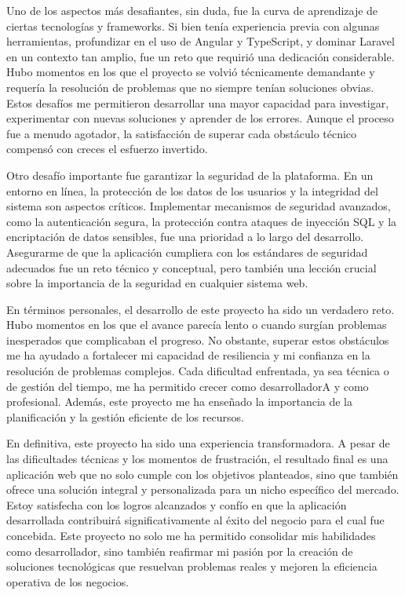 \vspace{0.5cm}

Uno de los aspectos más desafiantes, sin duda, fue la curva de aprendizaje de ciertas tecnologías y frameworks. Si bien tenía experiencia previa con algunas herramientas, profundizar en el uso de Angular y TypeScript, y dominar Laravel en un contexto tan amplio, fue un reto que requirió una dedicación considerable. Hubo momentos en los que el proyecto se volvió técnicamente demandante y requería la resolución de problemas que no siempre tenían soluciones obvias. Estos desafíos me permitieron desarrollar una mayor capacidad para investigar, experimentar con nuevas soluciones y aprender de los errores. Aunque el proceso fue a menudo agotador, la satisfacción de superar cada obstáculo técnico compensó con creces el esfuerzo invertido.

\vspace{0.5cm}

Otro desafío importante fue garantizar la seguridad de la plataforma. En un entorno en línea, la protección de los datos de los usuarios y la integridad del sistema son aspectos críticos. Implementar mecanismos de seguridad avanzados, como la autenticación segura, la protección contra ataques de inyección SQL y la encriptación de datos sensibles, fue una prioridad a lo largo del desarrollo. Asegurarme de que la aplicación cumpliera con los estándares de seguridad adecuados fue un reto técnico y conceptual, pero también una lección crucial sobre la importancia de la seguridad en cualquier sistema web.


\vspace{0.5cm}

En términos personales, el desarrollo de este proyecto ha sido un verdadero reto. Hubo momentos en los que el avance parecía lento o cuando surgían problemas inesperados que complicaban el progreso. No obstante, superar estos obstáculos me ha ayudado a fortalecer mi capacidad de resiliencia y mi confianza en la resolución de problemas complejos. Cada dificultad enfrentada, ya sea técnica o de gestión del tiempo, me ha permitido crecer como desarrolladorA y como profesional. Además, este proyecto me ha enseñado la importancia de la planificación y la gestión eficiente de los recursos.

\vspace{0.5cm}

En definitiva, este proyecto ha sido una experiencia transformadora. A pesar de las dificultades técnicas y los momentos de frustración, el resultado final es una aplicación web que no solo cumple con los objetivos planteados, sino que también ofrece una solución integral y personalizada para un nicho específico del mercado. Estoy satisfecha con los logros alcanzados y confío en que la aplicación desarrollada contribuirá significativamente al éxito del negocio para el cual fue concebida. Este proyecto no solo me ha permitido consolidar mis habilidades como desarrollador, sino también reafirmar mi pasión por la creación de soluciones tecnológicas que resuelvan problemas reales y mejoren la eficiencia operativa de los negocios.

